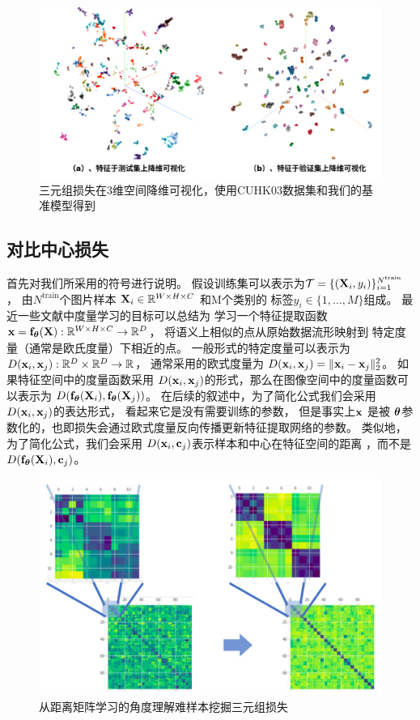 \begin{figure}
	\centering
	\includegraphics[width=\textwidth]{fig/tsne.png}
	\caption{三元组损失在3维空间降维可视化，使用CUHK03数据集和我们的基准模型得到}
	\label{fig:tsne}
\end{figure}


\subsection{对比中心损失}

首先对我们所采用的符号进行说明。
假设训练集可以表示为$\mathcal{T}=\{({\mathbf{X}}_i,y_i)\}_{i=1}^{N^{\textrm{train}}}$， 由$N^{\textrm{train}}$个图片样本
${\mathbf{X}}_i \in {\mathbb{R}}^{W\times H\times C}$
和M个类别的
标签$y_i \in \{1,\dots, M\}$组成。
最近一些文献中度量学习的目标可以总结为
学习一个特征提取函数
${\mathbf{x}} = {\mathbf{f}}_{\boldsymbol{\theta}} ({\mathbf{X}}): {\mathbb{R}}^{W \times H\times C} \rightarrow \mathbb{R}^D$，
将语义上相似的点从原始数据流形映射到
特定度量（通常是欧氏度量）下相近的点。
一般形式的特定度量可以表示为$D( {\mathbf{x}}_i, {\mathbf{x}}_j):\mathbb{R}^D \times \mathbb{R}^D \rightarrow \mathbb{R}$，
通常采用的欧式度量为
$D({\mathbf{x}}_i,{\mathbf{x}}_j)=\|{\mathbf{x}}_i - {\mathbf{x}}_j\|_2^2$。
如果特征空间中的度量函数采用
$D({\mathbf{x}}_i,  {\mathbf{x}}_j)$的形式，那么在图像空间中的度量函数可以表示为
$D({\mathbf{f}}_{\boldsymbol{\theta}}({\mathbf{X}}_i), {\mathbf{f}}_{\boldsymbol{\theta}}({\mathbf{X}}_j))$。
在后续的叙述中，为了简化公式我们会采用$D({\mathbf{x}}_i,  {\mathbf{x}}_j)$的表达形式，
看起来它是没有需要训练的参数，
但是事实上${\mathbf{x}}$ 是被 ${\boldsymbol{\theta}}$参数化的，也即损失会通过欧式度量反向传播更新特征提取网络的参数。
类似地，
为了简化公式，我们会采用
$D({\mathbf{x}}_i,{\mathbf{c}}_j)$表示样本和中心在特征空间的距离
，而不是$D({\mathbf{f}}_{\boldsymbol{\theta}}({\mathbf{X}}_i), {\mathbf{c}}_j)$。

\begin{figure}
	\centering 
	\includegraphics[width=\textwidth]{fig/2018-05-19-23-27-39.png}
	\caption{从距离矩阵学习的角度理解难样本挖掘三元组损失} \label{fig:distmat-tri}
\end{figure}

